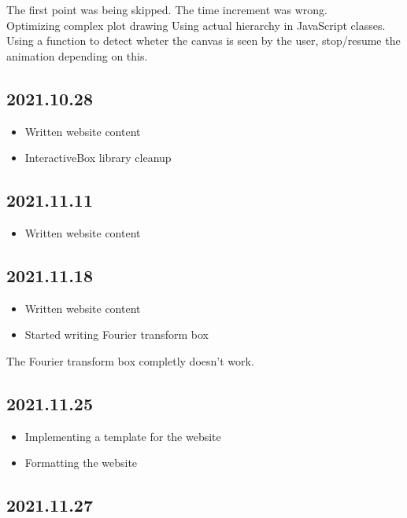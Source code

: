 \documentclass{article}
\begin{document}
The first point was being skipped. The time increment was wrong.
\\
Optimizing complex plot drawing
Using actual hierarchy in JavaScript classes.
Using a function to detect wheter the canvas is seen by the user,
stop/resume the animation depending on this.

\subsection*{2021.10.28}

\begin{itemize}
    \item Written website content
    \item InteractiveBox library cleanup
\end{itemize}

\subsection*{2021.11.11}

\begin{itemize}
    \item Written website content
\end{itemize}

\subsection*{2021.11.18}

\begin{itemize}
    \item Written website content
    \item Started writing Fourier transform box
\end{itemize}

The Fourier transform box completly doesn't work.

\subsection*{2021.11.25}

\begin{itemize}
    \item Implementing a template for the website
    \item Formatting the website
\end{itemize}

\subsection*{2021.11.27}
\end{document}
